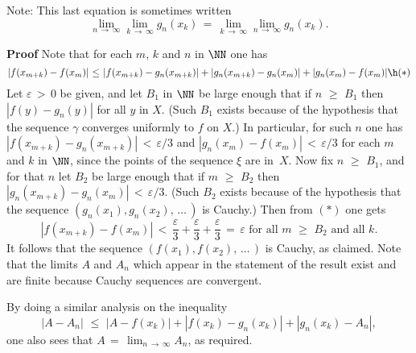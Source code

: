     Note: This last equation is sometimes written
        \begin{displaymath}
        \lim_{n \,{\rightarrow}\, {\infty}} \lim_{k \,{\rightarrow}\, {\infty}} g_{n}(x_{k}) \,=\, 
    \lim_{k \,{\rightarrow}\, {\infty}} \lim_{n \,{\rightarrow}\, {\infty}} g_{n}(x_{k}).
        \end{displaymath}

\V

        {\bf Proof} Note that for each $m$, $k$ and $n$ in ${\NN}$ one has
        \begin{displaymath}
        |f(x_{m+k}) - f(x_{m})|\,\,{\leq}\,\,|f(x_{m+k}) - g_{n}(x_{m+k})|
    + |g_{n}(x_{m+k}) - g_{n}(x_{m})| + |g_{n}(x_{m}) - f(x_{m})| \h ({\ast})
        \end{displaymath}
    Let ${\varepsilon}\,>\,0$ be given, and let $B_{1}$ in ${\NN}$ be large enough that if $n\,\,{\geq}\,\,B_{1}$ then $|f(y) - g_{n}(y)|$ for all $y$ in $X$.
    (Such $B_{1}$ exists because of the hypothesis that the sequence ${\gamma}$ converges uniformly to $f$ on $X$.)
    In particular, for such $n$ one has $|f(x_{m+k}) - g_{n}(x_{m+k})|\,<\,{\varepsilon}/3$ and $|g_{n}(x_{m}) - f(x_{m})|\,<\,{\varepsilon}/3$
    for each $m$ and $k$ in ${\NN}$, since the points of the sequence ${\xi}$ are in~$X$.
    Now fix $n\,\,{\geq}\,\,B_{1}$, and for that $n$ let $B_{2}$ be large enough that if $m\,\,{\geq}\,\,B_{2}$ then $|g_{n}(x_{m+k}) - g_{n}(x_{m})|\,<\,{\varepsilon}/3$.
    (Such $B_{2}$ exists because of the hypothesis that the sequence $(g_{n}(x_{1}),g_{n}(x_{2}),\,{\ldots}\,)$ is Cauchy.)
    Then from $({\ast})$ one gets
        \begin{displaymath}
        |f(x_{m+k}) - f(x_{m})|\,<\,\frac{{\varepsilon}}{3} + \frac{{\varepsilon}}{3} + \frac{{\varepsilon}}{3} \,=\, {\varepsilon} \mbox{ for all $m\,\,{\geq}\,\,B_{2}$ and all $k$}.
        \end{displaymath}
    It follows that the sequence $(f(x_{1}),f(x_{2}),\,{\ldots}\,)$ is Cauchy, as claimed.
    Note that the limits $A$ and $A_{n}$ which appear in the statement of the result exist and are finite because Cauchy sequences are convergent.

    By doing a similar analysis on the inequality
        \begin{displaymath}
        |A-A_{n}|\,\,{\leq}\,\,|A-f(x_{k})| + |f(x_{k}) - g_{n}(x_{k})| + |g_{n}(x_{k}) - A_{n}|,
        \end{displaymath}
    one also sees that $A \,=\, \lim_{n \,{\rightarrow}\, {\infty}} A_{n}$, as required.

